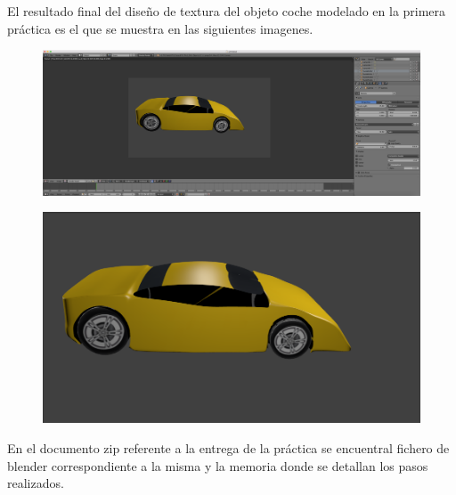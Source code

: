 \documentclass[10pt]{article}
\begin{document}
El resultado final del diseño de textura del objeto coche modelado en la primera práctica es el que se muestra en las siguientes imagenes. \\

\begin{figure}[H]
	\begin{center}
	 		\includegraphics[width = 1.00\textwidth]{Imagenes/p3-img26}
	\end{center} 
\end{figure}

\begin{figure}[H]
	\begin{center}
	 		\includegraphics[width = 1.00\textwidth]{Imagenes/p3-img23}
	\end{center} 
\end{figure}

En el documento zip referente a la entrega de la práctica se encuentral fichero de blender correspondiente a la misma y la memoria donde se detallan los pasos realizados.
\end{document}
